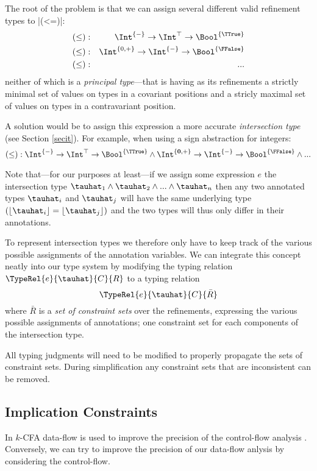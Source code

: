 The root of the problem is that we can assign several different valid refinement types to |(<=)|:
\begin{eqnarray*}
(\leq) &:& \Int^{\{-\}} \to \Int^\top \to \Bool^{\{\TTrue\}} \\
(\leq) &:& \Int^{\{0,+\}} \to \Int^{\{-\}} \to \Bool^{\{\FFalse\}} \\
(\leq) &:& ...
\end{eqnarray*}
neither of which is a \emph{principal type}---that is having as its refinements a strictly minimal set of values on types in a covariant positions and a stricly maximal set of values on types in a contravariant position.

A solution would be to assign this expression a more accurate \emph{intersection type} (see Section \ref{secit}). For example, when using a sign abstraction for integers: \[ (\leq) : \Int^{\{\mathbf{-}\}} \to \Int^\top \to \Bool^{\{\TTrue\}} \land \Int^{\{\mathbf{0}, \mathbf{+}\}} \to \Int^{\{\mathbf{-}\}} \to \Bool^{\{\FFalse\}} \land ... \]

Note that---for our purposes at least---if we assign some expression $e$ the intersection type $\tauhat_1 \land \tauhat_2 \land ... \land \tauhat_n$ then any two annotated types $\tauhat_i$ and $\tauhat_j$ will have the same underlying type $(\lfloor\tauhat_i\rfloor = \lfloor\tauhat_j\rfloor)$ and the two types will thus only differ in their annotations.

To represent intersection types we therefore only have to keep track of the various possible assignments of the annotation variables. We can integrate this concept neatly into our type system by modifying the typing relation $\TypeRel{e}{\tauhat}{C}{R}$ to a typing relation \[ \TypeRel{e}{\tauhat}{C}{\bar R} \] where $\bar R$ is a \emph{set of constraint sets} over the refinements, expressing the various possible assignments of annotations; one constraint set for each components of the intersection type.

All typing judgments will need to be modified to properly propagate the sets of constraint sets. During simplification any constraint sets that are inconsistent can be removed.

\subsection{Implication Constraints}\label{ctxsens}

In $k$-CFA data-flow is used to improve the precision of the control-flow analysis \cite{Shivers:1991:CAH:124950}. Conversely, we can try to improve the precision of our data-flow anlysis by considering the control-flow.

